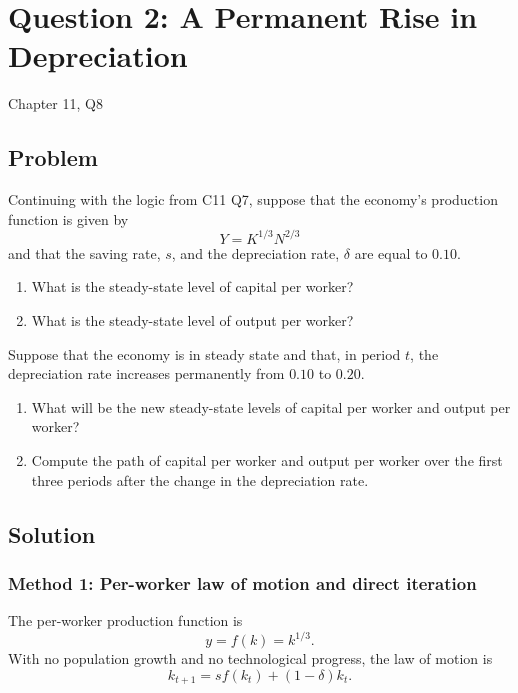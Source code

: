 \documentclass[12pt]{article}
\begin{document}
\newpage
\section{Question 2: A Permanent Rise in Depreciation}

\noindent
Chapter 11, Q8

\subsection{Problem}
Continuing with the logic from C11 Q7, suppose that the economy’s production function is given by
\[
Y = K^{1/3}N^{2/3}
\]
and that the saving rate, \(s\), and the depreciation rate, \(\delta\) are equal to \(0.10\).

\begin{enumerate}[label=(\alph*)]
    \item What is the steady-state level of capital per worker?
    \item What is the steady-state level of output per worker?
\end{enumerate}

Suppose that the economy is in steady state and that, in period \(t\), the depreciation rate increases permanently from \(0.10\) to \(0.20\).

\begin{enumerate}[label=(\alph*),start=3]
    \item What will be the new steady-state levels of capital per worker and output per worker?
    \item Compute the path of capital per worker and output per worker over the first three periods after the change in the depreciation rate.
\end{enumerate}

\subsection{Solution}

\subsubsection{Method 1: Per-worker law of motion and direct iteration}
The per-worker production function is
\[
y=f(k)=k^{1/3}.
\]
With no population growth and no technological progress, the law of motion is
\[
k_{t+1}=s f(k_t)+(1-\delta)k_t.
\]
\end{document}
